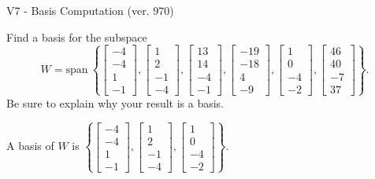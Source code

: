 \begin{exercise}
  \begin{exerciseTitle}V7 - Basis Computation (ver. 970)\end{exerciseTitle}
  \begin{exerciseStatement}
    Find a basis for the subspace 
\[W=\mathrm{span}\ \left\{\left[\begin{array}{r}
-4 \\
-4 \\
1 \\
-1
\end{array}\right] , \left[\begin{array}{r}
1 \\
2 \\
-1 \\
-4
\end{array}\right] , \left[\begin{array}{r}
13 \\
14 \\
-4 \\
-1
\end{array}\right] , \left[\begin{array}{r}
-19 \\
-18 \\
4 \\
-9
\end{array}\right] , \left[\begin{array}{r}
1 \\
0 \\
-4 \\
-2
\end{array}\right] , \left[\begin{array}{r}
46 \\
40 \\
-7 \\
37
\end{array}\right]\right\}.\]
 Be sure to explain why your result is a basis.


  \end{exerciseStatement}
  \begin{exerciseAnswer}
   A basis of \(W\) is  \(\left\{\left[\begin{array}{r}
-4 \\
-4 \\
1 \\
-1
\end{array}\right] , \left[\begin{array}{r}
1 \\
2 \\
-1 \\
-4
\end{array}\right] , \left[\begin{array}{r}
1 \\
0 \\
-4 \\
-2
\end{array}\right]\right\}\).
  


  \end{exerciseAnswer}
\end{exercise}